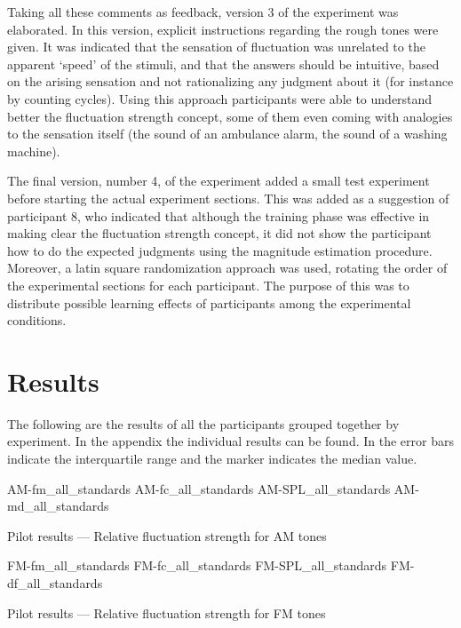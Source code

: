 \documentclass[../main.tex]{subfiles}
\begin{document}
Taking all these comments as feedback, version 3 of the experiment was
elaborated. In this version, explicit instructions regarding the rough tones
were given. It was indicated that the sensation of fluctuation was unrelated to
the apparent `speed' of the stimuli, and that the answers should be intuitive,
based on the arising sensation and not rationalizing any judgment about it
(for instance by counting cycles). Using this approach participants were able to
understand better the fluctuation strength concept, some of them even coming
with analogies to the sensation itself (the sound of an ambulance alarm, the
sound of a washing machine).

The final version, number 4, of the experiment added a small test experiment
before starting the actual experiment sections. This was added as a suggestion
of participant 8, who indicated that although the training phase was effective
in making clear the fluctuation strength concept, it did not show the
participant how to do the expected judgments using the magnitude estimation
procedure. Moreover, a latin square randomization approach was used, rotating
the order of the experimental sections for each participant. The purpose of this
was to distribute possible learning effects of participants among the
experimental conditions.

\section{Results}

The following are the results of all the participants grouped together by
experiment. In the appendix the individual results can be found. In
 the error bars
indicate the interquartile range and the marker indicates the median value.

\begin{pilotresults}

\myfigurequad%
  {AM-fm_all_standards}
  {AM-fc_all_standards}
  {AM-SPL_all_standards}
  {AM-md_all_standards}
  {
    \caption{Pilot results --- Relative fluctuation strength for AM tones}
\label{fig:pilot_AM_all_comparison}
  }

\myfigurequad%
  {FM-fm_all_standards}
  {FM-fc_all_standards}
  {FM-SPL_all_standards}
  {FM-df_all_standards}
  {
    \caption{Pilot results --- Relative fluctuation strength for FM tones}
\label{fig:pilot_FM_all_comparison}
  }

\end{pilotresults}
\end{document}
